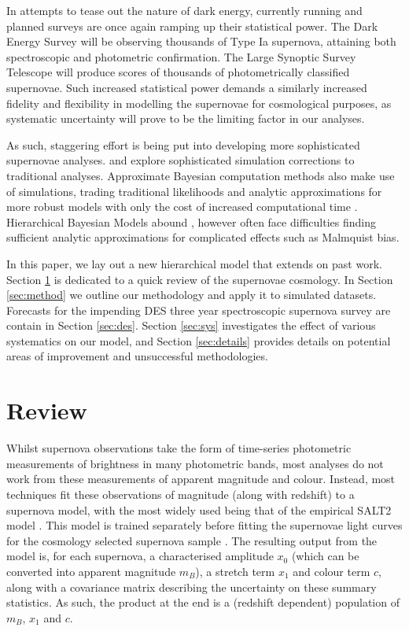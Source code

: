 \documentclass[a4paper,fleqn,usenatbib]{mnras}
\begin{document}
In attempts to tease out the nature of dark energy, currently running and planned surveys are once again ramping up their statistical power. The Dark Energy Survey \citep[DES,][]{Bernstein2012, Abbott2016} will be observing thousands of Type Ia supernova, attaining both spectroscopic and photometric confirmation. The Large Synoptic Survey Telescope \citep[LSST,][]{Ivezic2008, LSSTScienceCollaboration2009} will produce scores of thousands of photometrically classified supernovae. Such increased statistical power demands a similarly increased fidelity and flexibility in modelling the supernovae for cosmological purposes, as systematic uncertainty will prove to be the limiting factor in our analyses.

As such, staggering effort is being put into developing more sophisticated supernovae analyses. \citet{Scolnic2016} and \citet{Kessler2017} explore sophisticated simulation corrections to traditional analyses. Approximate Bayesian computation methods also make use of simulations, trading traditional likelihoods and analytic approximations for more robust models with only the cost of increased computational time \citep{Weyant2013, Jennings2016}. Hierarchical Bayesian Models abound \citep{Mandel2009, March2011, March2014a, Rubin2015, Shariff2016, Roberts2017}, however often face difficulties finding sufficient analytic approximations for complicated effects such as Malmquist bias.


In this paper, we lay out a new hierarchical model that extends on past work. Section \ref{sec:review} is dedicated to a quick review of the supernovae cosmology. In Section \ref{sec:method} we outline our methodology and apply it to simulated datasets. Forecasts for the impending DES three year spectroscopic supernova survey are contain in Section \ref{sec:des}. Section \ref{sec:sys} investigates the effect of various systematics on our model, and Section \ref{sec:details} provides details on potential areas of improvement and unsuccessful methodologies.






\section{Review}
\label{sec:review}

Whilst supernova observations take the form of time-series photometric measurements of brightness in many photometric bands, most analyses do not work from these measurements of apparent magnitude and colour. Instead, most techniques fit these observations of magnitude (along with redshift) to a supernova model, with the most widely used being that of the empirical SALT2 model \citep{Guy2007, Guy2010}. This model is trained separately before fitting the supernovae light curves for the cosmology selected supernova sample \citep{Guy2010, Mosher2014}. The resulting output from the model is, for each supernova, a characterised amplitude $x_0$ (which can be converted into apparent magnitude $m_B$), a stretch term $x_1$ and colour term $c$, along with a covariance matrix describing the uncertainty on these summary statistics. As such, the product at the end is a (redshift dependent) population of $m_B$, $x_1$ and $c$.
\end{document}
